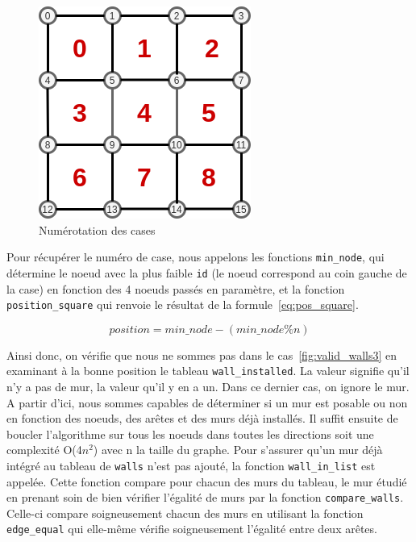 \documentclass[a4paper]{article}
\begin{document}
\begin{figure}[ht!]
    \centering
    \includegraphics[scale=0.75]{valid_walls4.png}
    \caption{Numérotation des cases}
    \label{fig:valid_walls4}
\end{figure}

Pour récupérer le numéro de case, nous appelons les fonctions \texttt{min\_node}, qui détermine le noeud avec la plus faible \texttt{id} (le noeud correspond au coin gauche de la case) en fonction des 4 noeuds passés en paramètre, et la fonction \texttt{position\_square} qui renvoie le résultat de la formule~\eqref{eq:pos_square}.

\begin{equation}
    position = min\_node - (min\_node \% n) 
    \label{eq:pos_square}
\end{equation}

Ainsi donc, on vérifie que nous ne sommes pas dans le cas~\ref{fig:valid_walls3} en examinant à la bonne position le tableau \texttt{wall\_installed}. La valeur  signifie qu'il n'y a pas de mur, la valeur  qu'il y en a un. Dans ce dernier cas, on ignore le mur. \\

A partir d'ici, nous sommes capables de déterminer si un mur est posable ou non en fonction des noeuds, des arêtes et des murs déjà installés. Il suffit ensuite de boucler l'algorithme sur tous les noeuds dans toutes les directions soit une complexité O(4$n^2$) avec n la taille du graphe. Pour s'assurer qu'un mur déjà intégré au tableau de  \texttt{walls} n'est pas ajouté, la fonction \texttt{wall\_in\_list} est appelée. Cette fonction compare pour chacun des murs du tableau, le mur étudié en prenant soin de bien vérifier l'égalité de murs par la fonction \texttt{compare\_walls}. Celle-ci compare soigneusement chacun des murs en utilisant la fonction \texttt{edge\_equal} qui elle-même vérifie soigneusement l'égalité entre deux arêtes. \\
\end{document}
